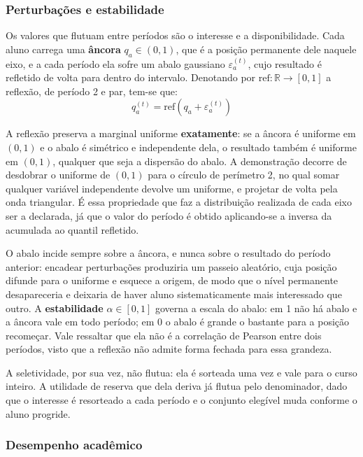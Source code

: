 \documentclass[
    12pt,
    openany,
    oneside,
    a4paper,
    english,
    brazil
]{abntex2}
\begin{document}
\subsubsection{Perturbações e estabilidade}

Os valores que flutuam entre períodos são o interesse e a disponibilidade. Cada aluno carrega uma \textbf{âncora} $q_a \in (0, 1)$, que é a posição permanente dele naquele eixo, e a cada período ela sofre um abalo gaussiano $\varepsilon_a^{(t)}$, cujo resultado é refletido de volta para dentro do intervalo. Denotando por $\mathrm{ref}: \mathbb{R} \rightarrow [0, 1]$ a reflexão, de período 2 e par, tem-se que:
\begin{equation}\label{eq:perturbacoes}
    q_a^{(t)} = \mathrm{ref}\left( q_a + \varepsilon_a^{(t)} \right)
\end{equation}

A reflexão preserva a marginal uniforme \textbf{exatamente}: se a âncora é uniforme em $(0, 1)$ e o abalo é simétrico e independente dela, o resultado também é uniforme em $(0, 1)$, qualquer que seja a dispersão do abalo. A demonstração decorre de desdobrar o uniforme de $(0, 1)$ para o círculo de perímetro 2, no qual somar qualquer variável independente devolve um uniforme, e projetar de volta pela onda triangular. É essa propriedade que faz a distribuição realizada de cada eixo ser a declarada, já que o valor do período é obtido aplicando-se a inversa da acumulada ao quantil refletido.

O abalo incide sempre sobre a âncora, e nunca sobre o resultado do período anterior: encadear perturbações produziria um passeio aleatório, cuja posição difunde para o uniforme e esquece a origem, de modo que o nível permanente desapareceria e deixaria de haver aluno sistematicamente mais interessado que outro. A \textbf{estabilidade} $\alpha \in [0, 1]$ governa a escala do abalo: em 1 não há abalo e a âncora vale em todo período; em 0 o abalo é grande o bastante para a posição recomeçar. Vale ressaltar que ela não é a correlação de Pearson entre dois períodos, visto que a reflexão não admite forma fechada para essa grandeza.

A seletividade, por sua vez, não flutua: ela é sorteada uma vez e vale para o curso inteiro. A utilidade de reserva que dela deriva já flutua pelo denominador, dado que o interesse é resorteado a cada período e o conjunto elegível muda conforme o aluno progride.

\subsubsection{Desempenho acadêmico}
\end{document}
